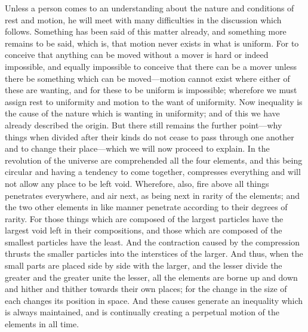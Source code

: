 Unless a person comes to an understanding about the nature and conditions
of rest and motion, he will meet with many difficulties in the discussion
which follows. Something has been said of this matter already, and
something more remains to be said, which is, that motion never exists in
what is uniform. For to conceive that anything can be moved without a
mover is hard or indeed impossible, and equally impossible to conceive
that there can be a mover unless there be something which can be moved—motion
cannot exist where either of these are wanting, and for these to be
uniform is impossible; wherefore we must assign rest to uniformity and
motion to the want of uniformity. Now inequality is the cause of the
nature which is wanting in uniformity; and of this we have already
described the origin. But there still remains the further point—why
things when divided after their kinds do not cease to pass through one
another and to change their place—which we will now proceed to
explain. In the revolution of the universe are comprehended all the four
elements, and this being circular and having a tendency to come together,
compresses everything and will not allow any place to be left void.
Wherefore, also, fire above all things penetrates everywhere, and air
next, as being next in rarity of the elements; and the two other elements
in like manner penetrate according to their degrees of rarity. For those
things which are composed of the largest particles have the largest void
left in their compositions, and those which are composed of the smallest
particles have the least. And the contraction caused by the compression
thrusts the smaller particles into the interstices of the larger. And
thus, when the small parts are placed side by side with the larger, and
the lesser divide the greater and the greater unite the lesser, all the
elements are borne up and down and hither and thither towards their own
places; for the change in the size of each changes its position in space.
And these causes generate an inequality which is always maintained, and is
continually creating a perpetual motion of the elements in all time.


